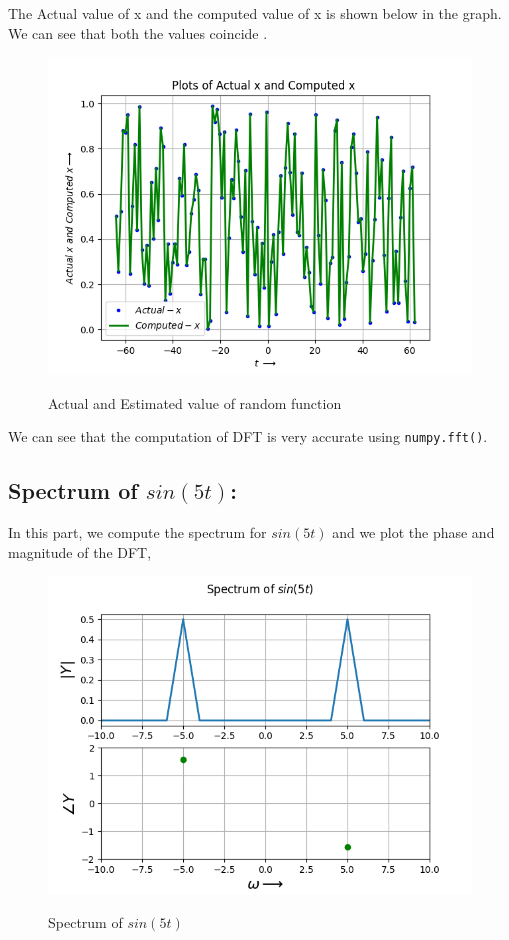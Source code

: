 \documentclass[11pt, a4paper]{article}
\begin{document}
The Actual value of x and the computed value of x is shown below in the graph. We can see that both the values coincide .
\begin{figure}[H]
\centering
\includegraphics[scale=0.6]{Figure_0.png}
\label{fig:fig_0}
\caption{Actual and Estimated value of random function}
\end{figure}

We can see that the computation of DFT is very accurate using \texttt{numpy.fft()}.

\subsection{Spectrum of $sin(5t)$:}
In this part, we compute the spectrum for $sin(5t)$ and  we plot the phase and magnitude of the DFT,

\begin{figure}[H]
\centering
\includegraphics[scale=0.6]{Figure_1.png}
\label{fig:fig_1}
\caption{Spectrum of $sin(5t)$}
\end{figure}
\end{document}
